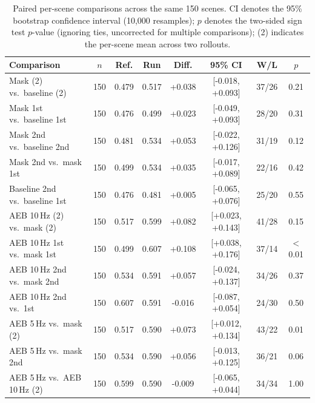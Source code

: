 \begin{table}[!htb]
\centering\scriptsize
\caption{Paired per-scene comparisons across the same 150 scenes. CI denotes the 95\% bootstrap confidence interval (10{,}000 resamples); $p$ denotes the two-sided sign test $p$-value (ignoring ties, uncorrected for multiple comparisons); (2) indicates the per-scene mean across two rollouts.}
\label{tab:app_pairs}
\begin{tabular}{lccccccc}
\toprule
Comparison & $n$ & Ref. & Run & Diff. & 95\% CI & W/L & $p$ \\
\midrule
Mask (2) vs.\ baseline (2) & 150 & 0.479 & 0.517 & +0.038 & [-0.018, +0.093] & 37/26 & 0.21 \\
Mask 1st vs.\ baseline 1st & 150 & 0.476 & 0.499 & +0.023 & [-0.049, +0.093] & 28/20 & 0.31 \\
Mask 2nd vs.\ baseline 2nd & 150 & 0.481 & 0.534 & +0.053 & [-0.022, +0.126] & 31/19 & 0.12 \\
Mask 2nd vs.\ mask 1st & 150 & 0.499 & 0.534 & +0.035 & [-0.017, +0.089] & 22/16 & 0.42 \\
Baseline 2nd vs.\ baseline 1st & 150 & 0.476 & 0.481 & +0.005 & [-0.065, +0.076] & 25/20 & 0.55 \\
AEB 10\,Hz (2) vs.\ mask (2) & 150 & 0.517 & 0.599 & +0.082 & [+0.023, +0.143] & 41/28 & 0.15 \\
AEB 10\,Hz 1st vs.\ mask 1st & 150 & 0.499 & 0.607 & +0.108 & [+0.038, +0.176] & 37/14 & $<$0.01 \\
AEB 10\,Hz 2nd vs.\ mask 2nd & 150 & 0.534 & 0.591 & +0.057 & [-0.024, +0.137] & 34/26 & 0.37 \\
AEB 10\,Hz 2nd vs.\ 1st & 150 & 0.607 & 0.591 & -0.016 & [-0.087, +0.054] & 24/30 & 0.50 \\
AEB 5\,Hz vs.\ mask (2) & 150 & 0.517 & 0.590 & +0.073 & [+0.012, +0.134] & 43/22 & 0.01 \\
AEB 5\,Hz vs.\ mask 2nd & 150 & 0.534 & 0.590 & +0.056 & [-0.013, +0.125] & 36/21 & 0.06 \\
AEB 5\,Hz vs.\ AEB 10\,Hz (2) & 150 & 0.599 & 0.590 & -0.009 & [-0.065, +0.044] & 34/34 & 1.00 \\
\bottomrule
\end{tabular}
\end{table}

